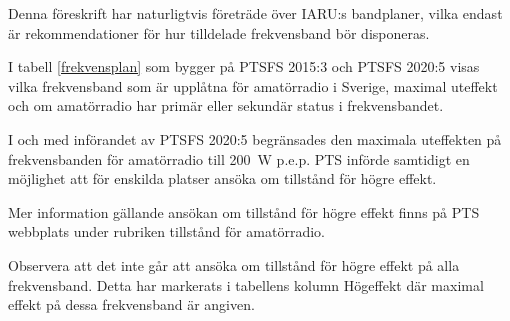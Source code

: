 Denna föreskrift har naturligtvis företräde över IARU:s bandplaner, vilka
endast är rekommendationer för hur tilldelade frekvensband bör disponeras.

I tabell \ref{frekvensplan} som bygger på PTSFS 2015:3 och PTSFS 2020:5 visas
vilka frekvensband som är upplåtna för amatörradio i Sverige, maximal uteffekt
och om amatörradio har primär eller sekundär status i frekvensbandet.

I och med införandet av PTSFS 2020:5 begränsades den maximala uteffekten på
frekvensbanden för amatörradio till \SI{200}{\watt} p.e.p.
PTS införde samtidigt en möjlighet att för enskilda platser ansöka om tillstånd
för högre effekt.

Mer information gällande ansökan om tillstånd för högre effekt finns på PTS
webbplats under rubriken tillstånd för amatörradio.

Observera att det inte går att ansöka om tillstånd för högre effekt på alla
frekvensband. Detta har markerats i tabellens kolumn Högeffekt där maximal
effekt på dessa frekvensband är angiven.

